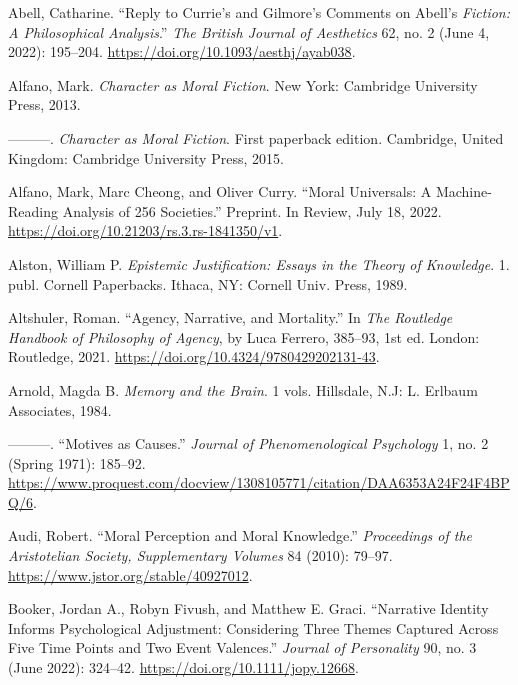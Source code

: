 \documentclass[
  12pt,
]{book}
\newlength{\cslhangindent}
\newenvironment{CSLReferences}[2] %
 {\begin{list}{}{%
  \setlength{\itemindent}{0pt}
  \setlength{\leftmargin}{0pt}
  \setlength{\parsep}{0pt}
  \ifodd #1
   \setlength{\leftmargin}{\cslhangindent}
   \setlength{\itemindent}{-1\cslhangindent}
  \fi
  \setlength{\itemsep}{#2\baselineskip}}}
 {\end{list}}
\theoremstyle{definition}
\theoremstyle{definition}
\theoremstyle{definition}
\theoremstyle{definition}
\theoremstyle{remark}
\begin{document}
\label{refs}
\begin{CSLReferences}{1}{0}
Abell, Catharine. {``Reply to {Currie}'s and {Gilmore}'s Comments on {Abell}'s {\emph{Fiction}}{\emph{:} }{\emph{A Philosophical Analysis}}.''} \emph{The British Journal of Aesthetics} 62, no. 2 (June 4, 2022): 195--204. \url{https://doi.org/10.1093/aesthj/ayab038}.

Alfano, Mark. \emph{Character as Moral Fiction}. New York: Cambridge University Press, 2013.

---------. \emph{Character as Moral Fiction}. First paperback edition. Cambridge, United Kingdom: Cambridge University Press, 2015.

Alfano, Mark, Marc Cheong, and Oliver Curry. {``Moral {Universals}: {A} Machine-Reading Analysis of 256 Societies.''} Preprint. In Review, July 18, 2022. \url{https://doi.org/10.21203/rs.3.rs-1841350/v1}.

Alston, William P. \emph{Epistemic Justification: Essays in the Theory of Knowledge}. 1. publ. Cornell Paperbacks. Ithaca, NY: Cornell Univ. Press, 1989.

Altshuler, Roman. {``Agency, Narrative, and Mortality.''} In \emph{The {Routledge Handbook} of {Philosophy} of {Agency}}, by Luca Ferrero, 385--93, 1st ed. London: Routledge, 2021. \url{https://doi.org/10.4324/9780429202131-43}.

Arnold, Magda B. \emph{Memory and the Brain}. 1 vols. Hillsdale, N.J: L. Erlbaum Associates, 1984.

---------. {``Motives as Causes.''} \emph{Journal of Phenomenological Psychology} 1, no. 2 (Spring 1971): 185--92. \url{https://www.proquest.com/docview/1308105771/citation/DAA6353A24F24F4BPQ/6}.

Audi, Robert. {``Moral {Perception} and {Moral Knowledge}.''} \emph{Proceedings of the Aristotelian Society, Supplementary Volumes} 84 (2010): 79--97. \url{https://www.jstor.org/stable/40927012}.

Booker, Jordan A., Robyn Fivush, and Matthew E. Graci. {``Narrative {Identity Informs Psychological Adjustment}: {Considering} Three Themes Captured Across Five Time Points and Two Event Valences.''} \emph{Journal of Personality} 90, no. 3 (June 2022): 324--42. \url{https://doi.org/10.1111/jopy.12668}.


\end{CSLReferences}
\end{document}
